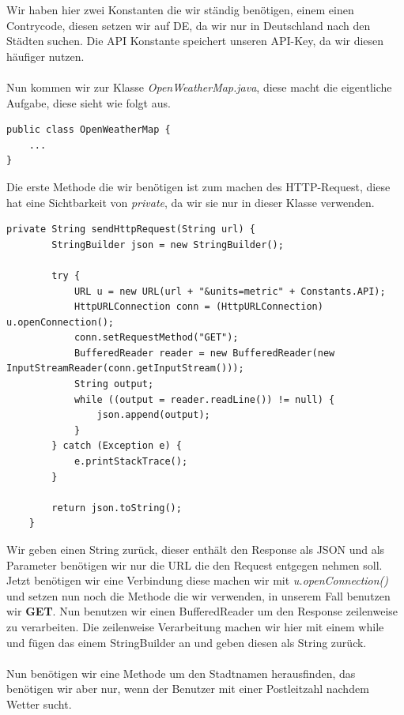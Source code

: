 Wir haben hier zwei Konstanten die wir ständig benötigen, einem einen Contrycode, diesen setzen wir auf DE, da wir nur in Deutschland nach den Städten suchen. Die API Konstante speichert unseren API-Key, da wir diesen häufiger nutzen.\\\\

Nun kommen wir zur Klasse \textit{OpenWeatherMap.java}, diese macht die eigentliche Aufgabe, diese sieht wie folgt aus. 
\begin{lstlisting}
public class OpenWeatherMap {
	...
}
\end{lstlisting}

Die erste Methode die wir benötigen ist zum machen des HTTP-Request, diese hat eine Sichtbarkeit von \textit{private}, da wir sie nur in dieser Klasse verwenden.

\begin{lstlisting}
private String sendHttpRequest(String url) {
        StringBuilder json = new StringBuilder();

        try {
            URL u = new URL(url + "&units=metric" + Constants.API);
            HttpURLConnection conn = (HttpURLConnection) u.openConnection();
            conn.setRequestMethod("GET");
            BufferedReader reader = new BufferedReader(new InputStreamReader(conn.getInputStream()));
            String output;
            while ((output = reader.readLine()) != null) {
                json.append(output);
            }
        } catch (Exception e) {
            e.printStackTrace();
        }

        return json.toString();
    }
\end{lstlisting}

Wir geben einen String zurück, dieser enthält den Response als JSON und als Parameter benötigen wir nur die URL die den Request entgegen nehmen soll. Jetzt benötigen wir eine Verbindung diese machen wir mit \textit{u.openConnection()} und setzen nun noch die Methode die wir verwenden, in unserem Fall benutzen wir \textbf{GET}. Nun benutzen wir einen BufferedReader um den Response zeilenweise zu verarbeiten. Die zeilenweise Verarbeitung machen wir hier mit einem while und fügen das einem StringBuilder an und geben diesen als String zurück.\\\\

Nun benötigen wir eine Methode um den Stadtnamen herausfinden, das benötigen wir aber nur, wenn der Benutzer mit einer Postleitzahl nachdem Wetter sucht.

